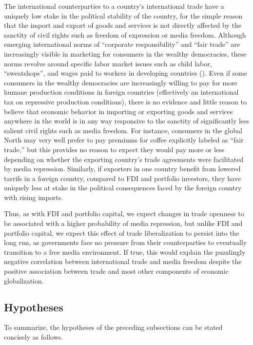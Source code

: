 \documentclass[12pt]{report}
\begin{document}
The international counterparties to a country's international trade have a uniquely low stake in the
political stability of the country, for the simple reason that the import and export of goods and
services is not directly affected by the sanctity of civil rights such as freedom of expression or
media freedom. Although emerging international norms of ``corporate responsibility'' and ``fair
trade'' are increasingly visible in marketing for consumers in the wealthy democracies, these norms
revolve around specific labor market issues such as child labor, ``sweatshops'', and wages paid to
workers in developing countries (\citealt{Moore:2004gy}). Even if some consumers in the wealthy
democracies are increasingly willing to pay for more humane production conditions in foreign
countries (effectively an international tax on repressive production conditions), there is no
evidence and little reason to believe that economic behavior in importing or exporting goods and
services anywhere in the world is in any way responsive to the sanctity of significantly less
salient civil rights such as media freedom. For instance, consumers in the global North may very
well prefer to pay premiums for coffee explicitly labeled as ``fair trade,'' but this provides no
reason to expect they would pay more or less depending on whether the exporting country's trade
agreements were facilitated by media repression. Similarly, if exporters in one country benefit from
lowered tarrifs in a foreign country, compared to FDI and portfolio investors, they have uniquely
less at stake in the political consequences faced by the foreign country with rising imports.

Thus, as with FDI and portfolio capital, we expect changes in trade openness to be associated with a
higher probability of media repression, but unlike FDI and portfolio capital, we expect this effect
of trade liberalization to persist into the long run, as governments face no pressure from their
counterparties to eventually transition to a free media environment. If true, this would explain the
puzzlingly negative correlation between international trade and media freedom despite the positive
association between trade and most other components of economic globalization.

\subsection{Hypotheses}

To summarize, the hypotheses of the preceding subsections can be stated concisely as follows.
\end{document}
